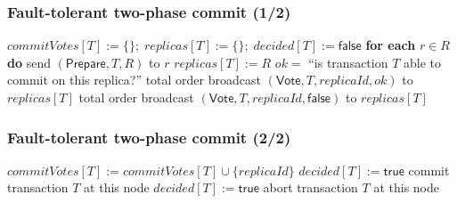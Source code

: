 \begin{frame}
    \label{s:paxos-commit1}
    \frametitle{Fault-tolerant two-phase commit (1/2)}
    \footnotesize
    \begin{algorithmic}
            \State $\mathit{commitVotes}[T] := \{\};\; \mathit{replicas}[T] := \{\};\; \mathit{decided}[T] := \mathsf{false}$
        \EndOn
        \State
            \State \textbf{for each} $r \in R$ \textbf{do} send $(\mathsf{Prepare}, T, R)$ to $r$
        \EndOn
        \State
            \State $\mathit{replicas}[T] := R$
            \State $\mathit{ok} = $ ``is transaction $T$ able to commit on this replica?''
            \State total order broadcast $(\mathsf{Vote}, T, \mathit{replicaId}, \mathit{ok})$ to $\mathit{replicas}[T]$
        \EndOn
        \State
                \State total order broadcast $(\mathsf{Vote}, T, \mathit{replicaId}, \mathsf{false})$ to $\mathit{replicas}[T]$
            \EndFor
        \EndOn
    \end{algorithmic}
\end{frame}
\label{l:paxos-commit1}

\begin{frame}
    \label{s:paxos-commit2}
    \frametitle{Fault-tolerant two-phase commit (2/2)}
    \footnotesize
    \begin{algorithmic}
                    \State $\mathit{commitVotes}[T] := \mathit{commitVotes}[T] \cup \{\mathit{replicaId}\}$
                        \State $\mathit{decided}[T] := \mathsf{true}$
                        \State commit transaction $T$ at this node
                    \EndIf
                \Else
                    \State $\mathit{decided}[T] := \mathsf{true}$
                    \State abort transaction $T$ at this node
                \EndIf
            \EndIf
        \EndOn
    \end{algorithmic}
\end{frame}
\label{l:paxos-commit2}


